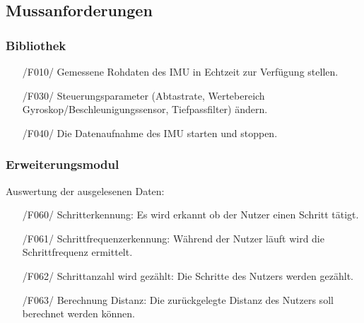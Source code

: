 \documentclass[a4paper,12pt]{article}
\begin{document}
  \subsection{Mussanforderungen}
    \subsubsection{Bibliothek}
    \begin{itemize}
      \item[/F010/] Gemessene \Gls{Rohdaten} des \Gls{IMU} in \Gls{Echtzeit} zur Verfügung stellen.
      \item[/F030/] \Gls{Steuerungsparameter} (Abtastrate, Wertebereich Gyroskop/Beschleunigungssensor, Tiefpassfilter) ändern. %
      \item[/F040/] Die Datenaufnahme des \Gls{IMU} starten und stoppen.
    \end{itemize}
    \subsubsection{Erweiterungsmodul}
     Auswertung der ausgelesenen Daten:
     \begin{itemize}
      \item[/F060/] \textsf{Schritterkennung:} Es wird erkannt ob der Nutzer einen Schritt tätigt.
      \item[/F061/] \textsf{Schrittfrequenzerkennung:} Während der Nutzer läuft wird die Schrittfrequenz ermittelt.
      \item[/F062/] \textsf{Schrittanzahl wird gezählt:} Die Schritte des Nutzers werden gezählt.
      \item[/F063/] \textsf{Berechnung Distanz:} Die zurückgelegte Distanz des Nutzers soll berechnet werden können.
    \end{itemize}
\end{document}
